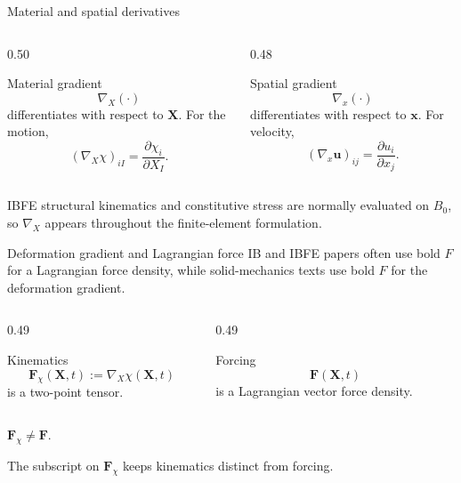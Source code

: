 \documentclass[aspectratio=169,11pt]{beamer}
\newcommand{\X}{\bm{X}}
\newcommand{\x}{\bm{x}}
\newcommand{\uEuler}{\bm{u}}
\newcommand{\Fdef}{\bm{F}_{\chi}}
\newcommand{\FLag}{\bm{F}}
\newcommand{\gradX}{\nabla_{\!X}}
\newcommand{\gradx}{\nabla_{\!x}}
\begin{document}
\begin{frame}{Material and spatial derivatives}
\begin{columns}[T,onlytextwidth]
\begin{column}{0.50\textwidth}
\begin{block}{Material gradient}
\[
  \gradX(\cdot)
\]
differentiates with respect to \(\X\). For the motion,
\[
  (\gradX\chi)_{iI}
  =\frac{\partial\chi_i}{\partial X_I}.
\]
\end{block}
\end{column}
\begin{column}{0.48\textwidth}
\begin{block}{Spatial gradient}
\[
  \gradx(\cdot)
\]
differentiates with respect to \(\x\). For velocity,
\[
  (\gradx\uEuler)_{ij}
  =\frac{\partial u_i}{\partial x_j}.
\]
\end{block}
\end{column}
\end{columns}
\medskip
\begin{punchbox}
\small
IBFE structural kinematics and constitutive stress are normally evaluated on \(B_0\), so \(\gradX\) appears throughout the finite-element formulation.
\end{punchbox}
\end{frame}

\begin{frame}{Deformation gradient and Lagrangian force}
IB and IBFE papers often use bold \(F\) for a Lagrangian force density, while solid-mechanics texts use bold \(F\) for the deformation gradient.
\begin{columns}[T,onlytextwidth]
\begin{column}{0.49\textwidth}
\begin{block}{Kinematics}
\[
  \Fdef(\X,t):=\gradX\chi(\X,t)
\]
is a two-point tensor.
\end{block}
\end{column}
\begin{column}{0.49\textwidth}
\begin{block}{Forcing}
\[
  \FLag(\X,t)
\]
is a Lagrangian vector force density.
\end{block}
\end{column}
\end{columns}
\medskip
\begin{punchbox}
\centering
\(\displaystyle
  \Fdef\neq\FLag .
\)\par\smallskip
\small The subscript on \(\Fdef\) keeps kinematics distinct from forcing.
\end{punchbox}
\end{frame}
\end{document}
